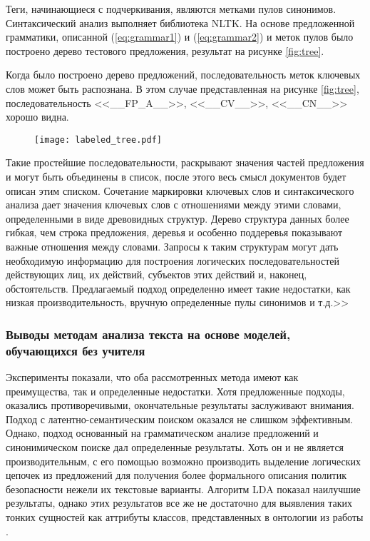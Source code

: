 \documentclass[../main]{subfiles}
\begin{document}
Теги, начинающиеся с подчеркивания, являются метками пулов синонимов. Синтаксический анализ выполняет библиотека NLTK. На основе предложенной грамматики, описанной (\ref{eq:grammar1}) и (\ref{eq:grammar2}) и меток пулов было построено дерево тестового предложения, результат на рисунке \ref{fig:tree}.

Когда было построено дерево предложений, последовательность меток ключевых слов может быть распознана. В этом случае представленная на рисунке \ref{fig:tree}, последовательность <<\_\_FP\_A\_\_>>, <<\_\_CV\_\_>>, <<\_\_CN\_\_>> хорошо видна.

\begin{figure}[H]
    \centering
    {\texttt{[image: labeled\_tree.pdf]}}
    \vspace{-\baselineskip}
\end{figure}

Такие простейшие последовательности, раскрывают значения частей предложения и могут быть объединены в список, после этого весь смысл документов будет описан этим списком. Сочетание маркировки ключевых слов и синтаксического анализа дает значения ключевых слов с отношениями между этими словами, определенными в виде древовидных структур. Дерево структура данных более гибкая, чем строка предложения, деревья и особенно поддеревья показывают важные отношения между словами. Запросы к таким структурам могут дать необходимую информацию для построения логических последовательностей действующих лиц, их действий, субъектов этих действий и, наконец, обстоятельств. Предлагаемый подход определенно имеет такие недостатки, как низкая производительность, вручную определенные пулы синонимов и т.д.>> \cite{LETI}

\subsubsection{Выводы методам анализа текста на основе моделей, обучающихся без учителя}

Эксперименты показали, что оба рассмотренных метода имеют как преимущества, так и определенные недостатки. Хотя предложенные подходы, оказались противоречивыми, окончательные результаты заслуживают внимания. Подход с латентно-семантическим поиском оказался не слишком эффективным. Однако, подход основанный на грамматическом анализе предложений и синонимическом поиске дал определенные результаты. Хоть он и не является производительным, с его помощью возможно производить выделение логических цепочек из предложений для получения более формального описания политик безопасности нежели их текстовые варианты. Алгоритм LDA показал наилучшие результаты, однако этих результатов все же не достаточно для выявления таких тонких сущностей как аттрибуты классов, представленных в онтологии из работы \cite{P2Onto}.
\end{document}
